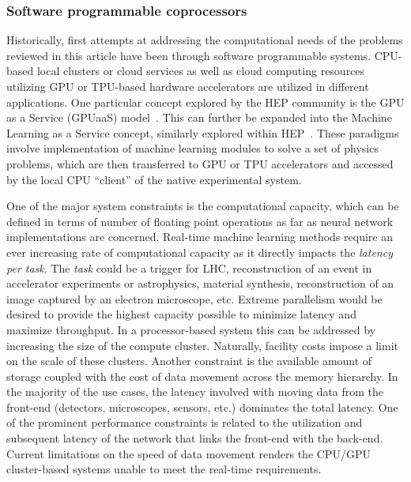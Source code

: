 \subsubsection{Software programmable coprocessors}
Historically, first attempts at addressing the computational needs of the problems reviewed in this article have been through software programmable systems. CPU-based local clusters or cloud services as well as cloud computing resources utilizing GPU or TPU-based hardware accelerators are utilized in different applications. One particular concept explored by the HEP community is the GPU as a Service (GPUaaS) model~\cite{krupa2020gpu}. This can further be expanded into the Machine Learning as a Service concept, similarly explored within HEP~\cite{kuznetsov2020mlaas4hep}. These paradigms involve implementation of machine learning modules to solve a set of physics problems, which are then transferred to GPU or TPU accelerators and accessed by the local CPU ``client'' of the native experimental system. 

One of the major system constraints is the computational capacity, which can be defined in terms of number of floating point operations as far as neural network implementations are concerned. Real-time machine learning methods require an ever increasing rate of computational capacity as it directly impacts the \textit{latency per task}. The \textit{task} could be a trigger for LHC, reconstruction of an event in accelerator experiments or astrophysics, material synthesis, reconstruction of an image captured by an electron microscope, etc. Extreme parallelism would be desired to provide the highest capacity possible to minimize latency and maximize throughput. In a processor-based system this can be addressed by increasing the size of the compute cluster. Naturally, facility costs impose a limit on the scale of these clusters. Another constraint is the available amount of storage coupled with the cost of data movement across the memory hierarchy. In the majority of the use cases, the latency involved with moving data from the front-end (detectors, microscopes, sensors, etc.) dominates the total latency. One of the prominent performance constraints is related to the utilization and subsequent latency of the network that links the front-end with the back-end. Current limitations on the speed of data movement renders the CPU/GPU cluster-based systems unable to meet the real-time requirements.               
